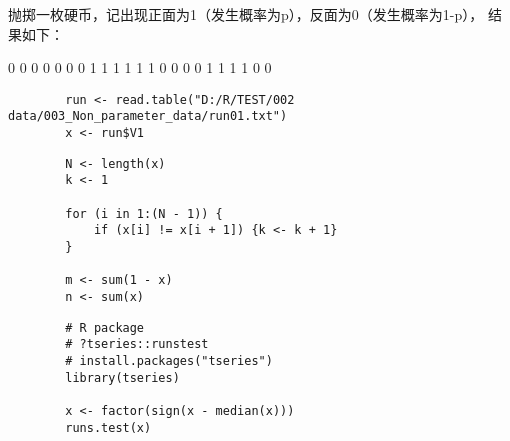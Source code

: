 \documentclass[UTF8]{ctexart}
\numberwithin{equation}{section}
\begin{document}
抛掷一枚硬币，记出现正面为1（发生概率为p），反面为0（发生概率为1-p），
结果如下：

\begin{center}
    0 0 0 0 0 0 0 1 1 1 1 1 1 0 0 0 0 1 1 1 1 0 0
\end{center}

\begin{center}
    \begin{lstlisting}
        run <- read.table("D:/R/TEST/002 data/003_Non_parameter_data/run01.txt")
        x <- run$V1
    \end{lstlisting}
\end{center}

\begin{center}
    \begin{lstlisting}
        N <- length(x)
        k <- 1

        for (i in 1:(N - 1)) {
            if (x[i] != x[i + 1]) {k <- k + 1}
        }

        m <- sum(1 - x)
        n <- sum(x)
    \end{lstlisting}
\end{center}

\begin{center}
    \begin{lstlisting}
        # R package
        # ?tseries::runstest
        # install.packages("tseries")
        library(tseries)

        x <- factor(sign(x - median(x)))
        runs.test(x)
    \end{lstlisting}
\end{center}
\end{document}
